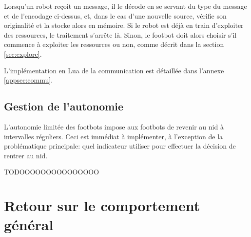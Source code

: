 Lorsqu'un robot reçoit un message, il le décode en se servant du type du message et de l'encodage ci-dessus, et, dans le cas d'une nouvelle source, vérifie son originalité et la stocke alors en mémoire. Si le robot est déjà en train d'exploiter des ressources, le traitement s'arrête là. Sinon, le footbot doit alors choisir s'il commence à exploiter les ressources ou non, comme décrit dans la section \ref{sec:explore}.

L'implémentation en Lua de la communication est détaillée dans l'annexe \ref{appsec:commu}.

\subsection{Gestion de l'autonomie}

L'autonomie limitée des footbots impose aux footbots de revenir au nid à intervalles réguliers. Ceci est immédiat à implémenter, à l'exception de la problématique principale: quel indicateur utiliser pour effectuer la décision de rentrer au nid.

TODOOOOOOOOOOOOOOO

\section{Retour sur le comportement général}

